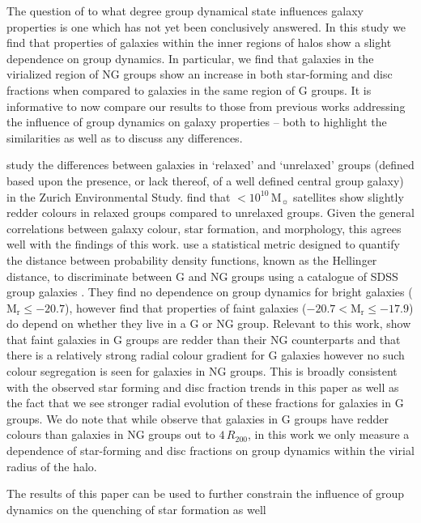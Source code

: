 \documentclass[a4paper,fleqn,usenatbib]{mnras}
\newcommand{\Msun}{\,\mathrm{M_{\sun}}}
\begin{document}
The question of to what degree group dynamical state influences galaxy
properties is one which has not yet been conclusively answered.  In
this study we find that properties of galaxies within the inner
regions of halos show a slight dependence on group dynamics.  In
particular, we find that galaxies in the virialized region of NG
groups show an increase in both star-forming and disc fractions
when compared to galaxies in the same region of G groups.  It is
informative to now compare our results to those from previous 
works addressing the influence of group dynamics on galaxy properties
-- both to highlight the similarities as well as to discuss any
differences.
\par
\citet{carollo2013} study the differences between galaxies in
`relaxed' and `unrelaxed' groups (defined based upon the presence, or
lack thereof, of a well defined central group galaxy) in the Zurich
Environmental Study.  \citet{carollo2013} find that $<10^{10}\Msun$
satellites show slightly redder colours in relaxed groups compared to
unrelaxed groups.  Given the general correlations between galaxy colour, star
formation, and morphology, this agrees well with the findings of this
work. \citet{ribeiro2013} use a statistical metric designed to quantify the
distance between probability density functions, known as the Hellinger
distance, to discriminate between G and NG groups using a
catalogue of SDSS group galaxies
\citep{berlind2006}.  They find no dependence on group dynamics for
bright galaxies ($\mathrm{M_r} \le -20.7$), however find that
properties of faint galaxies ($-20.7 < \mathrm{M_r} \le -17.9$) do
depend on whether they live in a G or NG group.  Relevant to this
work, \citet{ribeiro2013} show that faint galaxies in G groups are
redder than their NG counterparts and that there is a relatively
strong radial colour gradient for G galaxies however no such colour
segregation is seen for galaxies in NG groups.  This is broadly
consistent with the observed star forming and disc fraction trends in
this paper as well as the fact that we see stronger radial evolution
of these fractions for galaxies in G groups.  We do note that while
\citet{ribeiro2010} observe that galaxies in G groups have redder
colours than galaxies in NG groups out to $4\,R_{200}$, in this work
we only measure a dependence of star-forming and disc fractions on
group dynamics within the virial radius of the halo.
\par
The results of this paper can be used to further constrain the
influence of group dynamics on the quenching of star formation as well
\end{document}
